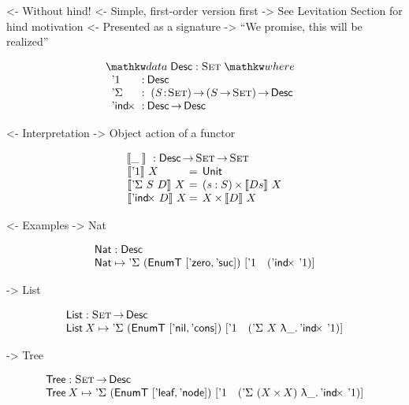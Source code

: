 \documentclass[preprint, authoryear]{sigplanconf}
\newenvironment{structure}{\footnotesize\verbatim}{\endverbatim}
\begin{document}
\begin{structure}
<- Without hind!
    <- Simple, first-order version first
    -> See Levitation Section for hind motivation
<- Presented as a signature
    -> ``We promise, this will be realized''
\end{structure}

\[
\stk{
\data \Desc : \Set \where \\
\;\;\begin{array}{@{}l@{\::\:}l@{\quad}l}
    \DUnit          & \Desc \\
    \DSigma         & \PI{\V{S}}{\Set} \PIS{S \To \Set} \Desc \\
    \DIndx          & \Desc \To \Desc
\end{array}
}
\]

\begin{structure}
<- Interpretation
    -> Object action of a functor
\end{structure}


\[\stk{
\:\:\descop{\_\:}{} : \Desc \To \Set \To \Set \\
\begin{array}{l@{\:=\:\:}ll}
\descop{\DUnit}{X}        &  \Unit                                       \\
\descop{\DSigma{S}{D}}{X} &  \SIGMAS{\V{s} : S}{\descop{D s}{X}}         \\
\descop{\DIndx{D}}{X}     &  \TIMES{X}{\descop{D}{X}}
\end{array}
}\]

\begin{structure}
<- Examples
    -> Nat
\end{structure}

\[\stk{
\Nat : \Desc \\
\Nat \mapsto \DSigma{(\EnumT [ \NatZero, \NatSuc ])}
                    {[ \DUnit \quad (\DIndx{\DUnit}) ]}
}\]

\begin{structure}
    -> List
\end{structure}

\[\stk{
\List : \Set \To \Desc \\
\List \: X \mapsto \DSigma{(\EnumT [ \ListNil, \ListCons ])}
                       {[ \DUnit \quad (\DSigma{X}{\LAM{\_} \DIndx{\DUnit}}) ]}
}\]

\begin{structure}
    -> Tree
\end{structure}

\[\stk{
\Tree : \Set \To \Desc \\
\Tree \: X \mapsto \DSigma{(\EnumT [ \TreeLeaf, \TreeNode ])}
                          {[ \DUnit \quad (\DSigma{(\TIMES{X}{X})}{\LAM{\_} \DIndx{\DUnit}}) ]}
}\]
\end{document}
